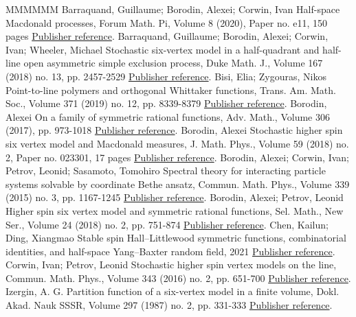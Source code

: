 \begin{thebibliography}{MMMMMM}
 Barraquand, Guillaume; Borodin, Alexei; Corwin, Ivan Half-space Macdonald processes, Forum Math. Pi, Volume 8 (2020), Paper no. e11, 150 pages \href{https://alco.centre-mersenne.org/articles/10.5802/alco.251/#BBC20}{Publisher reference}.
 Barraquand, Guillaume; Borodin, Alexei; Corwin, Ivan; Wheeler, Michael Stochastic six-vertex model in a half-quadrant and half-line open asymmetric simple exclusion process, Duke Math. J., Volume 167 (2018) no. 13, pp. 2457-2529 \href{https://alco.centre-mersenne.org/articles/10.5802/alco.251/#BBCW18}{Publisher reference}.
 Bisi, Elia; Zygouras, Nikos Point-to-line polymers and orthogonal Whittaker functions, Trans. Am. Math. Soc., Volume 371 (2019) no. 12, pp. 8339-8379 \href{https://alco.centre-mersenne.org/articles/10.5802/alco.251/#BZ19}{Publisher reference}.
 Borodin, Alexei On a family of symmetric rational functions, Adv. Math., Volume 306 (2017), pp. 973-1018 \href{https://alco.centre-mersenne.org/articles/10.5802/alco.251/#Bor17}{Publisher reference}.
 Borodin, Alexei Stochastic higher spin six vertex model and Macdonald measures, J. Math. Phys., Volume 59 (2018) no. 2, Paper no. 023301, 17 pages \href{https://alco.centre-mersenne.org/articles/10.5802/alco.251/#Bor18}{Publisher reference}.
 Borodin, Alexei; Corwin, Ivan; Petrov, Leonid; Sasamoto, Tomohiro Spectral theory for interacting particle systems solvable by coordinate Bethe ansatz, Commun. Math. Phys., Volume 339 (2015) no. 3, pp. 1167-1245 \href{https://alco.centre-mersenne.org/articles/10.5802/alco.251/#BCPS15}{Publisher reference}.
 Borodin, Alexei; Petrov, Leonid Higher spin six vertex model and symmetric rational functions, Sel. Math., New Ser., Volume 24 (2018) no. 2, pp. 751-874 \href{https://alco.centre-mersenne.org/articles/10.5802/alco.251/#BP18}{Publisher reference}.
 Chen, Kailun; Ding, Xiangmao Stable spin Hall–Littlewood symmetric functions, combinatorial identities, and half-space Yang–Baxter random field, 2021 \href{https://alco.centre-mersenne.org/articles/10.5802/alco.251/#CD21}{Publisher reference}.
 Corwin, Ivan; Petrov, Leonid Stochastic higher spin vertex models on the line, Commun. Math. Phys., Volume 343 (2016) no. 2, pp. 651-700 \href{https://alco.centre-mersenne.org/articles/10.5802/alco.251/#CP16}{Publisher reference}.
 Izergin, A. G. Partition function of a six-vertex model in a finite volume, Dokl. Akad. Nauk SSSR, Volume 297 (1987) no. 2, pp. 331-333 \href{https://alco.centre-mersenne.org/articles/10.5802/alco.251/#Ize87}{Publisher reference}.

\end{thebibliography}
